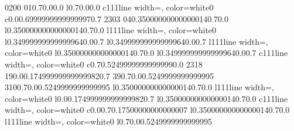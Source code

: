 \documentclass{standalone}
\begin{document}
\begin{knitdiagram}
{0}{2}{0}{0}
{0}{1}{0.7}{0.0}{0.0}
{l}{0.7}{0.0}{0.0}
{c}{1}{1}{1}{line width=\outlineThickness*\dx, color=white}{0}
{c}{0.0}{0.6999999999999997}{0.7}
{2}{3}{0}{3}
{0}{4}{0.35000000000000014}{0.7}{0.0}
{l}{0.35000000000000014}{0.7}{0.0}
{l}{1}{1}{1}{line width=\outlineThickness*\dx, color=white}{0}
{l}{0.34999999999999964}{0.0}{0.7}
{l}{0.34999999999999964}{0.0}{0.7}
{l}{1}{1}{1}{line width=\outlineThickness*\dx, color=white}{0}
{l}{0.35000000000000014}{0.7}{0.0}
{l}{0.34999999999999964}{0.0}{0.7}
{c}{1}{1}{1}{line width=\outlineThickness*\dx, color=white}{0}
{c}{0.7}{0.5249999999999999}{0.0}
{2}{3}{1}{8}
{1}{9}{0.0}{0.17499999999999982}{0.7}
{3}{9}{0.7}{0.0}{0.5249999999999995}
{3}{10}{0.7}{0.0}{0.5249999999999995}
{l}{0.35000000000000014}{0.7}{0.0}
{l}{1}{1}{1}{line width=\outlineThickness*\dx, color=white}{0}
{l}{0.0}{0.17499999999999982}{0.7}
{l}{0.35000000000000014}{0.7}{0.0}
{c}{1}{1}{1}{line width=\outlineThickness*\dx, color=white}{0}
{c}{0.0}{0.7}{0.17500000000000007}
{l}{0.35000000000000014}{0.7}{0.0}
{l}{1}{1}{1}{line width=\outlineThickness*\dx, color=white}{0}
{l}{0.7}{0.0}{0.5249999999999995}

\end{knitdiagram}
\end{document}
